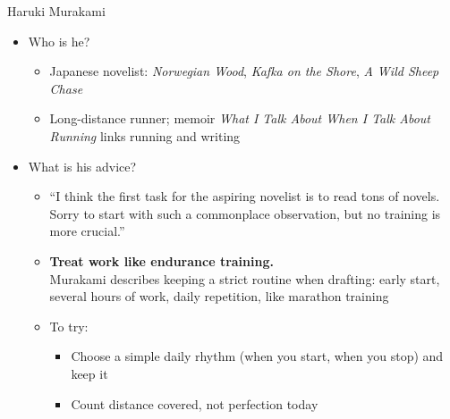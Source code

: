 \documentclass[aspectratio=169]{beamer}
\begin{document}
\begin{frame}{Haruki Murakami}
  \begin{itemize}
  \item Who is he?
    \begin{itemize}
    \item Japanese novelist: \emph{Norwegian Wood}, \emph{Kafka on the Shore}, \emph{A Wild Sheep Chase}
    \item Long-distance runner; memoir \emph{What I Talk About When I Talk About Running} links running and writing \citep{murakami:running}
  \end{itemize}
\item What is his advice?
  \begin{itemize}
  \item ``I think the first task for the aspiring novelist is to read
      tons of novels.  Sorry to start with such a commonplace observation, but
      no training is more crucial.'' \citep{Murakami:2022}
    \item \textbf{Treat work like endurance training.}\\
      Murakami describes keeping a strict routine when drafting: early start, several hours of work, daily repetition, like marathon training \citep{murakami:running,Murakami:2022}
    \item To try:
      \begin{itemize}
        \item Choose a simple daily rhythm (when you start, when you stop) and keep it
        \item Count distance covered, not perfection today
      \end{itemize}
    \end{itemize}
  \end{itemize}
\end{frame}

\end{document}
